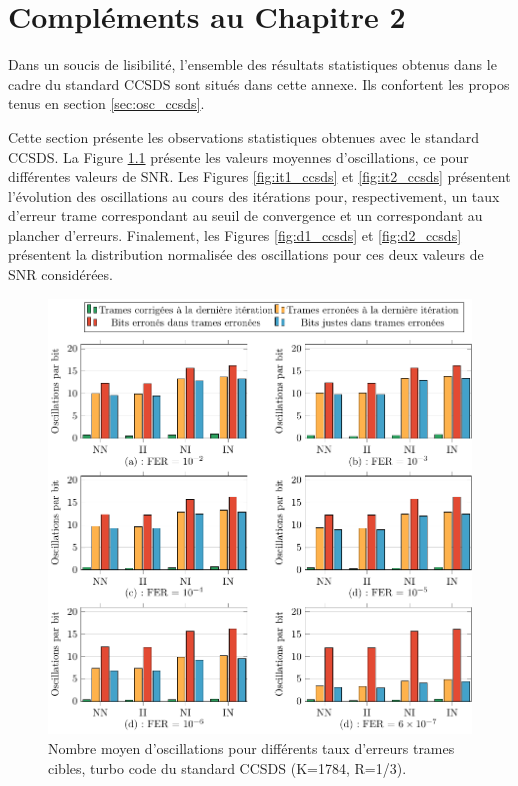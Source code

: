 

\chapter{Compléments au Chapitre 2}\label{sec:annCCSDS}
Dans un soucis de lisibilité, l'ensemble des résultats statistiques obtenus dans le cadre du standard CCSDS sont situés dans
cette annexe. Ils confortent les propos tenus en section \ref{sec:osc_ccsds}.

Cette section présente les observations statistiques obtenues avec le standard CCSDS. La Figure \ref{fig:m_ccsds} présente 
les valeurs moyennes d'oscillations, ce pour différentes valeurs de SNR. Les Figures \ref{fig:it1_ccsds} et \ref{fig:it2_ccsds}
présentent l'évolution des oscillations au cours des itérations pour, respectivement, un taux d'erreur trame correspondant 
au seuil de convergence et un correspondant au plancher d'erreurs. Finalement, les Figures \ref{fig:d1_ccsds} et \ref{fig:d2_ccsds} 
présentent la distribution normalisée des oscillations pour ces deux valeurs de SNR considérées.
\begin{figure}[tb]
	\begin{center}
	\includegraphics[width=\textwidth]{main/ch2_fig/tikz/m_ccsds.pdf}
	\caption{Nombre moyen d'oscillations pour différents taux d'erreurs trames cibles, turbo code du standard CCSDS (K=1784, R=1/3). \label{fig:m_ccsds}}
	\end{center}
\end{figure}


